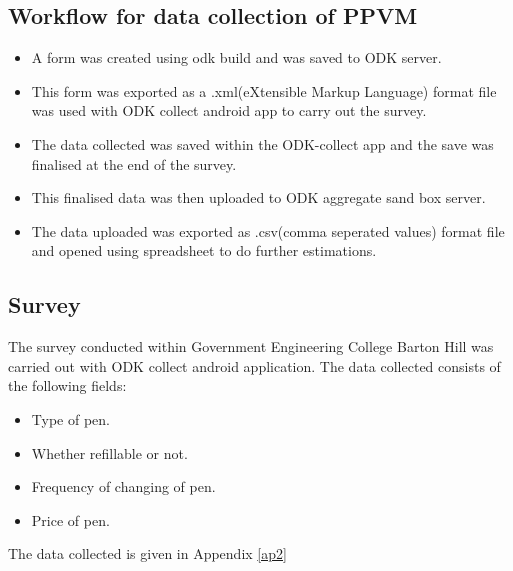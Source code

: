 


\subsection{Workflow for data collection of PPVM}
\begin{itemize}
\item A form was created using odk build and was saved to ODK server. \item This form was exported as a .xml(eXtensible Markup Language) format file was used with ODK collect android app to carry out the survey.
\item The data collected was saved within the ODK-collect app and the save was finalised at the end of the survey. 
\item This finalised data was then uploaded to ODK aggregate sand box server. 
\item The data uploaded was  exported as .csv(comma seperated values) format file and opened using spreadsheet to do further estimations.

\end{itemize}


\subsection{Survey}

The survey conducted within Government Engineering College Barton Hill was carried out with ODK collect android application. The data collected consists of the following fields:
\begin{itemize}
\item Type of pen.
\item Whether refillable or not.
\item Frequency of changing of pen.
\item Price of pen.
\end{itemize}
The data collected is given in Appendix \ref{ap2}

